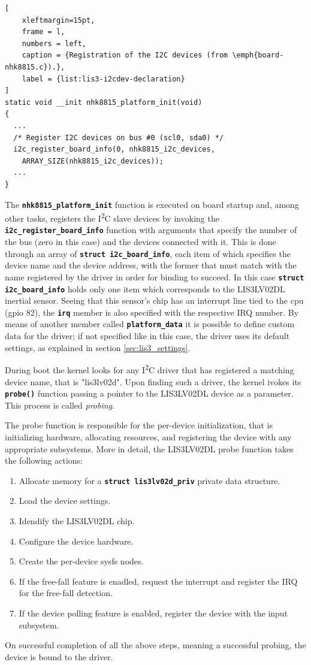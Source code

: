 \documentclass[a4paper,10pt]{article}
\newenvironment{packedenum}{
\begin{enumerate}
  \setlength{\itemsep}{3pt}
  \setlength{\parskip}{0pt}
  \setlength{\parsep}{0pt}
}{\end{enumerate}}
\newcommand{\iic}{I\textsuperscript{2}C }
\newcommand{\keyword}[1]{\texttt{\textbf{#1}}}
\begin{document}
\begin{multicols}{2}
\begin{lstlisting}[
	xleftmargin=15pt,
	frame = l,
	numbers = left,
	caption = {Registration of the I2C devices (from \emph{board-nhk8815.c}).},
	label = {list:lis3-i2cdev-declaration}
]
static void __init nhk8815_platform_init(void)
{
  ...
  /* Register I2C devices on bus #0 (scl0, sda0) */
  i2c_register_board_info(0, nhk8815_i2c_devices,
    ARRAY_SIZE(nhk8815_i2c_devices));
  ...
}
\end{lstlisting}

The \keyword{nhk8815\_platform\_init} function is executed on board startup
and, among other tasks, registers the \iic slave devices by invoking the
\keyword{i2c\_register\_board\_info} function with arguments that specify
the number of the bus (zero in this case) and the devices connected with it.
This is done through an array of \keyword{struct i2c\_board\_info}, each item
of which specifies the device name and the device address, with the former that
must match with the name registered by the driver in order for binding to succeed.
In this case \keyword{struct i2c\_board\_info} holds only one item which
corresponds to the LIS3LV02DL inertial sensor. Seeing that this sensor's chip
has an interrupt line tied to the cpu (gpio 82), the \keyword{irq} member is
also specified with the respective IRQ number. By means of another member
called \keyword{platform\_data} it is possible to define custom data for the
driver; if not specified like in this case, the driver uses its default
settings, as explained in section \ref{sec:lis3_settings}.

During boot the kernel looks for any \iic driver that has registered a matching
device name, that is "lis3lv02d". Upon finding such a driver, the kernel
ivokes its \keyword{probe()} function passing a pointer to the LIS3LV02DL
device as a parameter. This process is called \emph{probing}.

The probe function is responsible for the per-device initialization, that is
initializing hardware, allocating resources, and registering the device with
any appropriate subsystems. More in detail, the LIS3LV02DL probe function
takes the following actions:
\begin{packedenum}
	\item Allocate memory for a \keyword{struct lis3lv02d\_priv} private data
		structure.
	\item Load the device settings.
	\item Idendify the LIS3LV02DL chip.
	\item Configure the device hardware.
	\item Create the per-device sysfs nodes.
	\item If the free-fall feature is enadled, request the interrupt and
		register the IRQ for the free-fall detection.
	\item If the device polling feature is enabled, register the device with
		the input subsystem.
\end{packedenum}
On successful completion of all the above steps, meaning a successful probing,
the device is bound to the driver.



\end{multicols}
\end{document}
